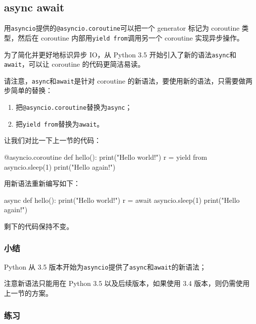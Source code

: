\hypertarget{async-await}{%
\subsection{async await}\label{async-await}}

用\texttt{asyncio}提供的\texttt{@asyncio.coroutine}可以把一个 generator
标记为 coroutine 类型，然后在 coroutine
内部用\texttt{yield\ from}调用另一个 coroutine 实现异步操作。

为了简化并更好地标识异步 IO，从 Python 3.5
开始引入了新的语法\texttt{async}和\texttt{await}，可以让 coroutine
的代码更简洁易读。

请注意，\texttt{async}和\texttt{await}是针对 coroutine
的新语法，要使用新的语法，只需要做两步简单的替换：

\begin{enumerate}
\def\labelenumi{\arabic{enumi}.}
\item
  把\texttt{@asyncio.coroutine}替换为\texttt{async}；
\item
  把\texttt{yield\ from}替换为\texttt{await}。
\end{enumerate}

让我们对比一下上一节的代码：

\begin{pythoncode}
@asyncio.coroutine
def hello():
    print("Hello world!")
    r = yield from asyncio.sleep(1)
    print("Hello again!")
\end{pythoncode}

用新语法重新编写如下：

\begin{pythoncode}
async def hello():
    print("Hello world!")
    r = await asyncio.sleep(1)
    print("Hello again!")
\end{pythoncode}

剩下的代码保持不变。

\hypertarget{ux5c0fux7ed3}{%
\subsubsection{小结}\label{ux5c0fux7ed3}}

Python 从 3.5
版本开始为\texttt{asyncio}提供了\texttt{async}和\texttt{await}的新语法；

注意新语法只能用在 Python 3.5 以及后续版本，如果使用 3.4
版本，则仍需使用上一节的方案。

\hypertarget{ux7ec3ux4e60}{%
\subsubsection{练习}\label{ux7ec3ux4e60}}

